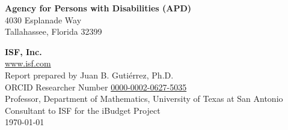 \begin{flushleft}

\phantom{ghost text}

\vspace{\fill}

\noindent \textbf{Agency for Persons with Disabilities (APD)} \\
4030 Esplanade Way \\
Tallahassee, Florida 32399

\vspace{1cm}
\noindent \textbf{ISF, Inc.} \\
\href{https://www.isf.com}{www.isf.com} \\
Report prepared by Juan B. Gutiérrez, Ph.D.\\
ORCID Researcher Number \href{https://orcid.org/0000-0002-0627-5035}{0000-0002-0627-5035} \\
Professor, Department of  Mathematics, University of Texas at San Antonio\\
Consultant to ISF for the iBudget Project\\
\today
\end{flushleft}





\tableofcontents

\newpage


